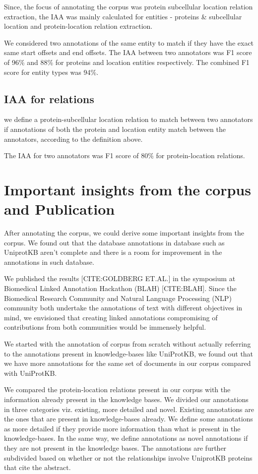 Since, the focus of annotating the corpus was protein subcellular location relation extraction, the IAA was mainly calculated for entities - proteins \& subcellular location and protein-location relation extraction.

We considered two annotations of the same entity to match if they have the exact same start offsets and end offsets. The IAA between two annotators was F1 score of  96\% and 88\% for proteins and location entities respectively. The combined F1 score for entity types was 94\%.

\subsection*{IAA for relations}

we define a protein-subcellular location relation to match between two annotators if annotations of both the protein and location entity match between the annotators, according to the definition above.

The IAA for two annotators was F1 score of 80\% for protein-location relations.

\section{Important insights from the corpus and Publication}

After annotating the corpus, we could derive some important insights from the corpus. We found out that the database annotations in database such as UniprotKB aren't complete and there is a room for improvement in the annotations in such database.

We published the results [CITE:GOLDBERG ET.AL.] in the symposium at Biomedical Linked Annotation Hackathon (BLAH) [CITE:BLAH]. Since the Biomedical Research Community and Natural Language Processing (NLP) community both undertake the annotations of text with different objectives in mind, we envisioned that creating linked annotations compromising of contributions from both communities would be immensely helpful. 

We started with the annotation of corpus from scratch without actually referring to the annotations present in knowledge-bases like UniProtKB, we found out that we have more annotations for the same set of documents in our corpus compared with UniProtKB.

We compared the protein-location relations present in our corpus with the information already present in the knowledge bases. We divided our annotations in three categories viz. existing, more detailed and novel. Existing annotations are the ones that are present in knowledge-bases already. We define some annotations as more detailed if they provide more information than what is present in the knowledge-bases. In the same way, we define annotations as novel annotations if they are not present in the knowledge bases. The annotations are further subdivided based on whether or not the relationships involve UniprotKB proteins that cite the abstract.

